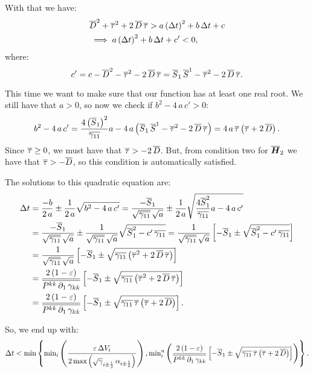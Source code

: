 \documentclass[10pt,preprint]{aastex}
\begin{document}
With that we have:
\begin{align}
    &\overline{D}^{2}+\overline{\tau}^{2}+2\,\overline{D}\,\overline{\tau}>a\left(\Delta t\right)^{2}+b\,\Delta t+c\\
    &\implies a\left(\Delta t\right)^{2}+b\,\Delta t+c'<0,
\end{align}
where:
\begin{equation}
  c'=c-\overline{D}^{2}-\overline{\tau}^{2}-2\,\overline{D}\,\overline{\tau}=\overline{S}_{1}\,\overline{S}^{1}-\overline{\tau}^{2}-2\,\overline{D}\,\overline{\tau}.
\end{equation}

This time we want to make sure that our function has at least one real root. We still have that $a>0$, so now we check if $b^{2}-4\,a\,c'>0$:
\begin{equation}
    b^{2}-4\,a\,c'=\frac{4\left(\overline{S}_{1}\right)^{2}}{\overline{\gamma_{11}}}a-4\,a\left(\overline{S}_{1}\,\overline{S}^{1}-\overline{\tau}^{2}-2\,\overline{D}\,\overline{\tau}\right)=4\,a\,\overline{\tau}\left(\overline{\tau}+2\,\overline{D}\right).
\end{equation}
Since $\overline{\tau}\geq0$, we must have that $\overline{\tau}>-2\,\overline{D}$. But, from condition two for $\overline{\boldsymbol{H}}_{2}$ we have that $\overline{\tau}>-\overline{D}$, so this condition is automatically satisfied.

The solutions to this quadratic equation are:
\begin{align}
    \Delta t&=\frac{-b}{2\,a}\pm\frac{1}{2\,a}\sqrt{b^{2}-4\,a\,c'}=\frac{-\overline{S}_{1}}{\sqrt{\overline{\gamma_{11}}}\,\sqrt{a}}\pm\frac{1}{2\,a}\sqrt{\frac{4\overline{S}_{1}^{2}}{\overline{\gamma_{11}}}a-4\,a\,c'}\\
    &=\frac{-\overline{S}_{1}}{\sqrt{\overline{\gamma_{11}}}\,\sqrt{a}}\pm\frac{1}{\sqrt{\overline{\gamma_{11}}}\,\sqrt{a}}\sqrt{\overline{S}_{1}^{2}-c'\,\overline{\gamma_{11}}}=\frac{1}{\sqrt{\overline{\gamma_{11}}}\,\sqrt{a}}\left[-\overline{S}_{1}\pm\sqrt{\overline{S}_{1}^{2}-c'\,\overline{\gamma_{11}}}\right]\\
    &=\frac{1}{\sqrt{\overline{\gamma_{11}}}\,\sqrt{a}}\left[-\overline{S}_{1}\pm\sqrt{\overline{\gamma_{11}}\left(\overline{\tau}^{2}+2\,\overline{D}\,\overline{\tau}\right)}\right]\\
    &=\frac{2\left(1-\varepsilon\right)}{\overline{P^{kk}\,\partial_{1}\,\gamma_{kk}}}\left[-\overline{S}_{1}\pm\sqrt{\overline{\gamma_{11}}\left(\overline{\tau}^{2}+2\,\overline{D}\,\overline{\tau}\right)}\right]\\
    &=\frac{2\left(1-\varepsilon\right)}{\overline{P^{kk}\,\partial_{1}\,\gamma_{kk}}}\left[-\overline{S}_{1}\pm\sqrt{\overline{\gamma_{11}}\,\overline{\tau}\left(\overline{\tau}+2\,\overline{D}\right)}\right].
\end{align}

So, we end up with:
\begin{equation}
    \Delta t<\text{min}\left\{\text{min}_{i}\left(\frac{\varepsilon\,\Delta V_{i}}{2\,\text{max}\left(\sqrt{\gamma}_{i\pm\frac{1}{2}}\,\alpha_{i\pm\frac{1}{2}}\right)}\right),\text{min}^{n}_{i}\left(\frac{2\left(1-\varepsilon\right)}{\overline{P^{kk}\,\partial_{1}\,\gamma_{kk}}}\left[-\overline{S}_{1}\pm\sqrt{\overline{\gamma_{11}}\,\overline{\tau}\left(\overline{\tau}+2\,\overline{D}\right)}\right]\right)\right\}.
\end{equation}
\end{document}
